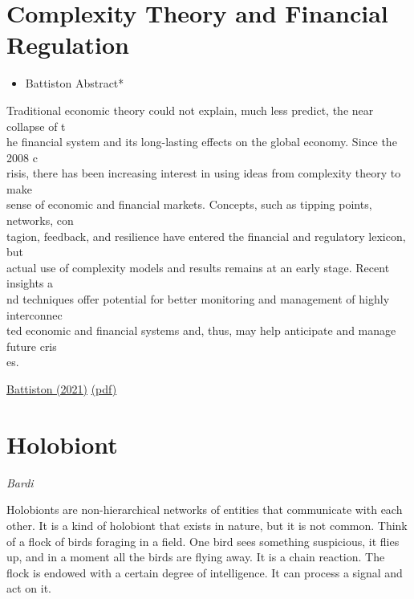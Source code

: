 \documentclass[
]{book}
\providecommand{\tightlist}{%
  \setlength{\itemsep}{0pt}\setlength{\parskip}{0pt}}
\begin{document}
\hypertarget{complexity-theory-and-financial-regulation}{%
\section{Complexity Theory and Financial Regulation}\label{complexity-theory-and-financial-regulation}}

\begin{itemize}
\tightlist
\item
  Battiston Abstract*
\end{itemize}

Traditional economic theory could not explain, much less predict, the near collapse of t\\
he financial system and its long-lasting effects on the global economy. Since the 2008 c\\
risis, there has been increasing interest in using ideas from complexity theory to make\\
sense of economic and financial markets. Concepts, such as tipping points, networks, con\\
tagion, feedback, and resilience have entered the financial and regulatory lexicon, but\\
actual use of complexity models and results remains at an early stage. Recent insights a\\
nd techniques offer potential for better monitoring and management of highly interconnec\\
ted economic and financial systems and, thus, may help anticipate and manage future cris\\
es.

\href{https://www.science.org/doi/10.1126/science.aad0299}{Battiston (2021)}
\href{pdf/Battiston_2021_Complexity_Theory_and_Financial_Regulation.pdf}{(pdf)}

\hypertarget{holobiont}{%
\section{Holobiont}\label{holobiont}}

\emph{Bardi}

Holobionts are non-hierarchical networks of entities that communicate with each other. It is a kind of holobiont that exists in nature, but it is not common. Think of a flock of birds foraging in a field. One bird sees something suspicious, it flies up, and in a moment all the birds are flying away.
It is a chain reaction. The flock is endowed with a certain degree of intelligence. It can process a signal and act on it.
\end{document}
